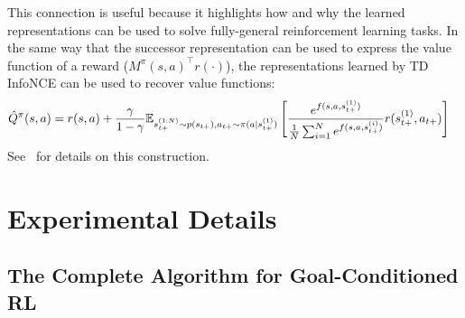 \documentclass{article} %
\begin{document}
This connection is useful because it highlights how and why the learned representations can be used to solve fully-general reinforcement learning tasks. In the same way that the successor representation can be used to express the value function of a reward ($M^\pi(s, a)^\top r(\cdot)$), the representations learned by TD InfoNCE can be used to recover value functions:
\begin{align*}
    \hat{Q}^\pi(s, a) &= r(s, a) + \frac{\gamma}{1 - \gamma} \mathbb{E}_{s_{t+}^{(1:N)} \sim p(s_{t+}), a_{t+} \sim \pi(a \mid s_{t+}^{(1)})} \left[ \frac{e^{f(s, a, s_{t+}^{(1)})}}{ \frac{1}{N} \sum_{i=1}^N e^{f(s, a, s_{t+}^{(i)})}} r(s_{t+}^{(1)}, a_{t+}) \right]
\end{align*}
See~\citet{mazoure2022contrastive} for details on this construction.



















\section{Experimental Details}

\subsection{The Complete Algorithm for Goal-Conditioned RL}
\label{appendix:implementation}
\end{document}
